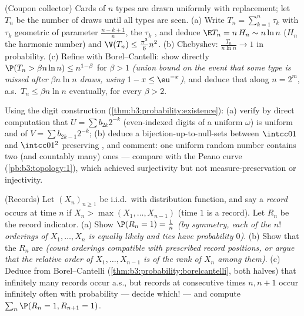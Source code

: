 \begin{exercise}[$\star\star\star$]\label{exo:b3:probability:9}
(Coupon collector) Cards of $n$ types are drawn uniformly
with replacement; let $T_n$ be the number of draws until all
types are seen.
(a) Write $T_n = \sum_{k=1}^{n}\tau_k$ with $\tau_k$
geometric of parameter $\frac{n - k + 1}n$, the $\tau_k$
, and deduce $\E T_n = n\,H_n \sim n\ln n$
($H_n$ the harmonic number) and $\V(T_n) \leq
\frac{\pi^2}6n^2$.
(b) Chebyshev: $\frac{T_n}{n\ln n} \to 1$ in probability.
(c) Refine with Borel--Cantelli: show directly $\P(T_n >
\beta n\ln n) \leq n^{1 - \beta}$ for $\beta > 1$
\emph{(union bound on the event that some type is missed
after $\beta n\ln n$ draws, using $1 - x \leq \eu^{-x}$)},
and deduce that along $n = 2^m$, a.s.\ $T_n \leq \beta n\ln
n$ eventually, for every $\beta > 2$.
\end{exercise}

\begin{exercise}[$\star\star$]\label{exo:b3:probability:10}
Using the digit construction
(\cref{thm:b3:probability:existence}):
(a) verify by direct computation that $U = \sum b_{2k}2^{-k}$
(even-indexed digits of a uniform $\omega$) is uniform and
 of $V = \sum b_{2k-1}2^{-k}$;
(b) deduce a  bijection-up-to-null-sets between
$\intcc01$ and $\intcc01^2$ preserving , and comment:
one uniform random number contains two (and countably many)
 ones --- compare with the Peano curve
(\cref{pb:b3:topology:1}), which achieved surjectivity but
not measure-preservation or injectivity.
\end{exercise}

\begin{exercise}[$\star\star$]\label{exo:b3:probability:11}
(Records) Let $(X_n)_{n\geq1}$ be i.i.d.\ with 
distribution function, and say a \emph{record} occurs at
time $n$ if $X_n > \max(X_1, \dots, X_{n-1})$ (time $1$ is
a record). Let $R_n$ be the record indicator.
(a) Show $\P(R_n = 1) = \frac1n$ \emph{(by symmetry, each of
the $n!$ orderings of $X_1, \dots, X_n$ is equally likely
and ties have probability $0$)}.
(b) Show that the $R_n$ are \emph{} \emph{(count
orderings compatible with prescribed record positions, or
argue that the relative order of $X_1, \dots, X_{n-1}$ is
 of the rank of $X_n$ among them)}.
(c) Deduce from Borel--Cantelli
(\cref{thm:b3:probability:borelcantelli}, both halves) that
infinitely many records occur a.s., but records at
consecutive times $n, n+1$ occur infinitely often with
probability --- decide which! --- and compute
$\sum_n\P(R_n = 1, R_{n+1} = 1)$.
\end{exercise}


